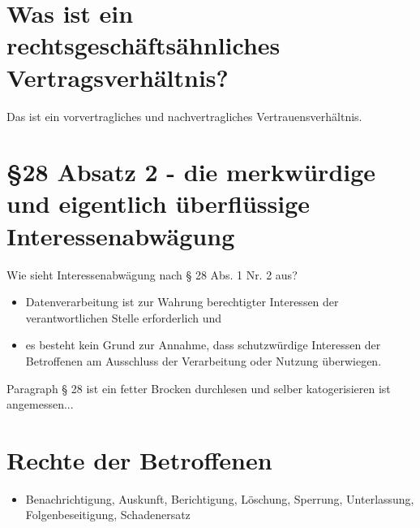 \documentclass[a4paper,10pt]{scrartcl}
\begin{document}
\section{ Was ist ein rechtsgeschäftsähnliches Vertragsverhältnis?   }

Das ist ein vorvertragliches und nachvertragliches Vertrauensverhältnis.

\section{ §28 Absatz 2 - die merkwürdige und eigentlich überflüssige Interessenabwägung}

Wie sieht Interessenabwägung nach § 28 Abs. 1 Nr. 2 aus?\\
\begin{itemize}
 \item Datenverarbeitung ist zur Wahrung berechtigter  Interessen der 
  verantwortlichen Stelle erforderlich und 
  \item es besteht kein Grund zur Annahme, dass  schutzwürdige 
  Interessen der Betroffenen am Ausschluss der Verarbeitung 
  oder Nutzung überwiegen. 
\end{itemize}

Paragraph § 28 ist ein fetter Brocken durchlesen und selber katogerisieren ist angemessen...

\section{Rechte der Betroffenen}

\begin{itemize}
 \item Benachrichtigung, Auskunft, Berichtigung, Löschung, Sperrung, Unterlassung, Folgenbeseitigung, Schadenersatz
 \end{itemize}
 
\end{document}
